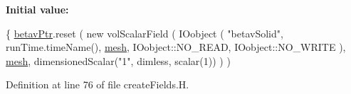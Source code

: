 {\bfseries Initial value\+:}
\begin{DoxyCode}
\{
    \hyperlink{FMU4FOAM_2application_2solver_2solidFoamAdjustTime_2createFields_8H_a844785a2088bf2e5befbb423d1e57112}{betavPtr}.reset
    (
        \textcolor{keyword}{new} volScalarField
        (
            IOobject
            (
                \textcolor{stringliteral}{"betavSolid"},
                runTime.timeName(),
                \hyperlink{createMeshesPostProcess_8H_a8bb1e58291d2d2b653e024a4f4bffe38}{mesh},
                IOobject::NO\_READ,
                IOobject::NO\_WRITE
            ),
            \hyperlink{createMeshesPostProcess_8H_a8bb1e58291d2d2b653e024a4f4bffe38}{mesh},
            dimensionedScalar(\textcolor{stringliteral}{"1"}, dimless, scalar(1))
        )
    )
\end{DoxyCode}


Definition at line 76 of file create\+Fields.\+H.

